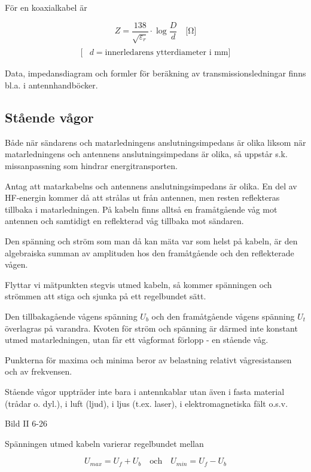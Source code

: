 För en koaxialkabel är

\[
Z = \frac{138}{\sqrt{\varepsilon_r}}\cdot\log\frac{D}{d} \quad \text{[Ω]}
\]
\begin{align*}
[&D = \text{ytterledarens innerdiameter i mm}] \\
[&d = \text{innerledarens ytterdiameter i mm}]
\end{align*}

Data, impedansdiagram och formler för beräkning av
transmissionsledningar finns bl.a. i antennhandböcker.

\subsection{Stående vågor}

Både när sändarens och matarledningens anslutningsimpedans är olika
liksom när matarledningens och antennens anslutningsimpedans är olika,
så uppstår s.k. missanpassning som hindrar energitransporten.

Antag att matarkabelns och antennens anslutningsimpedans är olika. En
del av HF-energin kommer då att strålas ut från antennen, men resten
reflekteras tillbaka i matarledningen. På kabeln finns alltså en
framåtgående våg mot antennen och samtidigt en reflekterad våg
tillbaka mot sändaren.

Den spänning och ström som man då kan mäta var som helst på kabeln, är
den algebraiska summan av amplituden hos den framåtgående och den
reflekterade vågen.

Flyttar vi mätpunkten stegvis utmed kabeln, så kommer spänningen och
strömmen att stiga och sjunka på ett regelbundet sätt.

Den tillbakagående vågens spänning \(U_b\) och den framåtgående vågens
spänning \(U_t\) överlagras på varandra. Kvoten för ström och spänning
är därmed inte konstant utmed matarledningen, utan får ett vågformat
förlopp - en stående våg.

Punkterna för maxima och minima beror av belastning relativt
vågresistansen och av frekvensen.

Stående vågor uppträder inte bara i antennkablar utan även i fasta
material (trådar o. dyl.), i luft (ljud), i ljus (t.ex. laser), i
elektromagnetiska fält o.s.v.

Bild II 6-26

Spänningen utmed kabeln varierar regelbundet mellan

\[U_{max} = U_f + U_b \quad \text{och} \quad U_{min} = U_f - U_b\]

